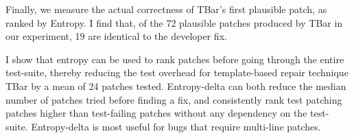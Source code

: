 \documentclass[12pt,openany,oneside,table]{cmuthesis}
\begin{document}
Finally, we measure the actual correctness of TBar's first plausible patch, as ranked by Entropy. 
I find that, of the 72 plausible patches produced by TBar in our experiment, 19 are identical to the developer fix. 

\begin{tcolorbox}
  [colback=white,colframe=black,arc=0pt,boxrule=0.5pt,title=RQ1
 Summary,boxsep=2pt,left=1pt,right=1pt,top=1pt,bottom=1pt,fonttitle=\bfseries]
 I show that entropy can be used to rank patches before going through the
 entire test-suite, thereby reducing the test overhead for template-based repair
 technique TBar by a mean of 24 patches tested. Entropy-delta can both reduce
 the median number of patches tried before finding a fix, and consistently rank
 test patching patches higher than test-failing patches without any dependency
 on the test-suite. Entropy-delta is most useful for bugs that require
 multi-line patches.
\end{tcolorbox}
\end{document}
